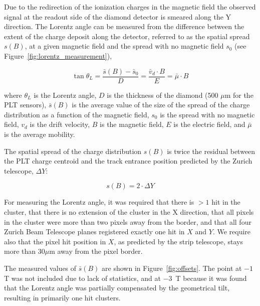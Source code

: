 \documentclass[journal]{IEEEtran}
\begin{document}
Due to the redirection of the ionization charges in the magnetic
field the observed signal at the readout side of the diamond detector
is smeared along the Y direction. 
The Lorentz angle can be measured from the difference between the extent of the charge deposit along the detector, referred to as the
spatial spread $s(B)$, at a given magnetic field and the spread with no
magnetic field $s_0$ (see Figure~\ref{fig:lorentz_measurement}),

\begin{equation}
\tan\theta_L = 	\frac{\bar{s}(B) - \bar{s}_0}{D} = \frac{\bar{v}_d \cdot B}{E} = \bar{\mu}\cdot B
\end{equation}

where $\theta_L$ is the Lorentz angle,  $D$ is the thickness of the diamond (500 $\mu$m for the PLT sensors), $\bar{s}(B)$ is the average value of the size of the spread of the charge distribution as a function of the magnetic field, $s_0$ is the spread with no magnetic field, $v_d$ is the drift velocity, $B$ is the magnetic field, $E$ is the electric field, and $\bar{\mu}$ is the average mobility.

The spatial spread of the charge distribution $s(B)$ is twice
the residual between the PLT charge centroid and the track 
entrance position predicted by the Zurich telescope, $\Delta Y$:

\begin{equation}
s(B) = 2 \cdot \Delta Y
\end{equation}

For measuring the Lorentz angle, it was required that there is $>1$ hit in the cluster, that there is no extension of the cluster in the X direction, that all pixels in the cluster were more than two pixels away from the border, and that all four Zurich Beam Telescope planes registered exactly one hit in $X$ and $Y$.  We require also that the pixel hit position in $X$, as predicted by the strip telescope, stays more than $30 \mu$m away from the pixel border. 


The measured values of $\bar{s}(B)$ are shown in Figure~\ref{fig:offsets}.    The point at $-1$ T was not included due to lack of statistics, and at $-3$~T because it was found that the Lorentz angle was partially compensated by the geometrical tilt, resulting in primarily one hit clusters.   
\end{document}
